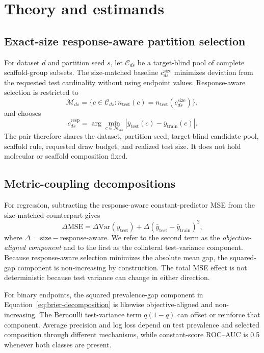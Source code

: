 \section{Theory and estimands}

\subsection{Exact-size response-aware partition selection}

For dataset $d$ and partition seed $s$, let $\mathcal C_{ds}$ be a target-blind pool of complete scaffold-group subsets. The size-matched baseline $c^{\mathrm{size}}_{ds}$ minimizes deviation from the requested test cardinality without using endpoint values. Response-aware selection is restricted to
\begin{equation}
\mathcal M_{ds}=\{c\in\mathcal C_{ds}:n_{\mathrm{test}}(c)=n_{\mathrm{test}}(c^{\mathrm{size}}_{ds})\},
\end{equation}
and chooses
\begin{equation}
c^{\mathrm{resp}}_{ds}=\arg\min_{c\in\mathcal M_{ds}}\left|\bar y_{\mathrm{test}}(c)-\bar y_{\mathrm{train}}(c)\right|.
\label{eq:response-selection}
\end{equation}
The pair therefore shares the dataset, partition seed, target-blind candidate pool, scaffold rule, requested draw budget, and realized test size. It does not hold molecular or scaffold composition fixed.

\subsection{Metric-coupling decompositions}

For regression, subtracting the response-aware constant-predictor MSE from the size-matched counterpart gives
\begin{equation}
\Delta\mathrm{MSE}=\Delta\mathrm{Var}(y_{\mathrm{test}})+\Delta(\bar y_{\mathrm{test}}-\bar y_{\mathrm{train}})^2,
\label{eq:mse-effect-decomposition}
\end{equation}
where $\Delta=\mathrm{size}-\mathrm{response\mbox{-}aware}$. We refer to the second term as the \emph{objective-aligned component} and to the first as the collateral test-variance component. Because response-aware selection minimizes the absolute mean gap, the squared-gap component is non-increasing by construction. The total MSE effect is not deterministic because test variance can change in either direction.

For binary endpoints, the squared prevalence-gap component in Equation~\ref{eq:brier-decomposition} is likewise objective-aligned and non-increasing. The Bernoulli test-variance term $q(1-q)$ can offset or reinforce that component. Average precision and log loss depend on test prevalence and selected composition through different mechanisms, while constant-score ROC--AUC is 0.5 whenever both classes are present.
